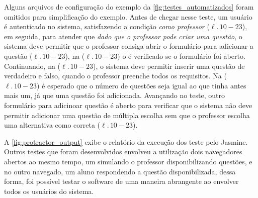 Alguns arquivos de configuração do exemplo da \autoref{fig:testes_automatizados} foram
omitidos para simplificação do exemplo. Antes de chegar nesse teste, um usuário é autenticado
no sistema, satisfazendo a condição \textit{como professor} ($\ell.\,10-23$), em seguida,
para atender que \textit{dado que o professor pode criar uma questão}, o sistema deve permitir
que o professor consiga abrir o formulário para adicionar a questão ($\ell.\,10-23$), na ($\ell.\,10-23$)
o é verificado se o formulário foi aberto. Continuando, na ($\ell.\,10-23$), o sistema deve
permitir inserir uma questão de verdadeiro e falso, quando o professor preenche todos os requisitos.
Na ($\ell.\,10-23$) é esperado que o número de questões seja igual ao que tinha antes mais um, já que
uma questão foi adicionada. Avançando no teste, outro formulário para adicinoar questão é aberto
para verificar que o sistema não deve permitir adicionar uma questão de múltipla escolha sem que o
professor escolha uma alternativa como correta ($\ell.\,10-23$).

A \autoref{fig:protractor_output} exibe o relatório da execução dos teste pelo Jasmine. Outros testes
que foram desenvolvidos envolveu a utilização dois navegadores abertos ao mesmo tempo, um simulando
o professor disponibilizando questões, e no outro navegado, um aluno respondendo a questão disponibilizada, dessa forma,
foi possível testar o software de uma maneira abrangente ao envolver todos os usuários do sistema.

